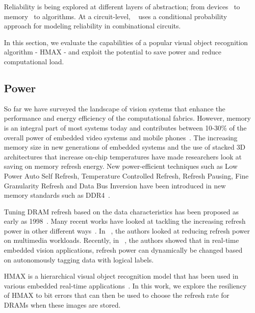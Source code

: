 
Reliability is being explored at different layers of abstraction; from devices~\cite{Datta2014,Datta2015,Rahul2015} to memory~\cite{isca2014} to algorithms.
At a circuit-level, ~\cite{chen2015fast} uses a conditional probability approach for modeling reliability in combinational circuits.

In this section, we evaluate the capabilities of a popular visual object recognition algorithm - HMAX - and exploit the potential to save 
power and reduce computational load.

\subsection{Power}

So far we have surveyed the landscape of vision systems that enhance the 
performance and energy efficiency of the computational fabrics. 
However, memory is an integral part of most systems today and contributes 
between 10-30\% of the overall power of embedded video systems and 
mobile phones~\cite{CarrollAaronHeiser2010}. 
The increasing memory size in new generations of embedded systems and 
the use of stacked 3D architectures that increase on-chip temperatures 
have made researchers look at saving on memory refresh energy. 
New power-efficient techniques such as Low Power Auto Self Refresh, Temperature Controlled Refresh, Refresh Pausing, Fine Granularity Refresh and Data Bus 
Inversion have been introduced in new memory standards such as 
DDR4~\cite{jedec-sdram-standards}.  

Tuning DRAM refresh based on the data characteristics has been proposed as early as 1998~\cite{islped98}.  
Many recent works have looked at tackling the increasing refresh power in other 
different ways~\cite{Liu2012, Stuecheli2010}. In ~\cite{Liu2011}, the 
authors looked at reducing refresh power on multimedia workloads. Recently, in ~\cite{iccd2014}, the authors showed that in 
real-time embedded vision applications, refresh power can dynamically be changed based on autonomously tagging data with logical labels.

HMAX is a hierarchical visual object recognition model that has been used in various embedded real-time applications~\cite{Kestur2012, Maashri2012a}. In this work, we explore the resiliency of HMAX to bit errors that can then be used to choose the refresh rate for DRAMs when these images are stored.  

